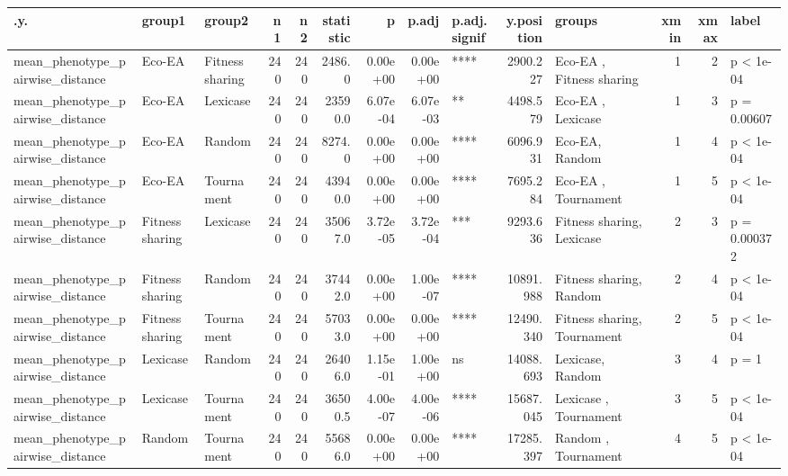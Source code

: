 \documentclass[]{book}
\begin{document}
\begin{table}
\centering
\begin{tabular}[t]{l|l|l|r|r|r|r|r|l|r|l|r|r|l}
\hline
.y. & group1 & group2 & n1 & n2 & statistic & p & p.adj & p.adj.signif & y.position & groups & xmin & xmax & label\\
\hline
mean\_phenotype\_pairwise\_distance & Eco-EA & Fitness sharing & 240 & 240 & 2486.0 & 0.00e+00 & 0.00e+00 & **** & 2900.227 & Eco-EA         , Fitness sharing & 1 & 2 & p < 1e-04\\
\hline
mean\_phenotype\_pairwise\_distance & Eco-EA & Lexicase & 240 & 240 & 23590.0 & 6.07e-04 & 6.07e-03 & ** & 4498.579 & Eco-EA  , Lexicase & 1 & 3 & p = 0.00607\\
\hline
mean\_phenotype\_pairwise\_distance & Eco-EA & Random & 240 & 240 & 8274.0 & 0.00e+00 & 0.00e+00 & **** & 6096.931 & Eco-EA, Random & 1 & 4 & p < 1e-04\\
\hline
mean\_phenotype\_pairwise\_distance & Eco-EA & Tournament & 240 & 240 & 43940.0 & 0.00e+00 & 0.00e+00 & **** & 7695.284 & Eco-EA    , Tournament & 1 & 5 & p < 1e-04\\
\hline
mean\_phenotype\_pairwise\_distance & Fitness sharing & Lexicase & 240 & 240 & 35067.0 & 3.72e-05 & 3.72e-04 & *** & 9293.636 & Fitness sharing, Lexicase & 2 & 3 & p = 0.000372\\
\hline
mean\_phenotype\_pairwise\_distance & Fitness sharing & Random & 240 & 240 & 37442.0 & 0.00e+00 & 1.00e-07 & **** & 10891.988 & Fitness sharing, Random & 2 & 4 & p < 1e-04\\
\hline
mean\_phenotype\_pairwise\_distance & Fitness sharing & Tournament & 240 & 240 & 57033.0 & 0.00e+00 & 0.00e+00 & **** & 12490.340 & Fitness sharing, Tournament & 2 & 5 & p < 1e-04\\
\hline
mean\_phenotype\_pairwise\_distance & Lexicase & Random & 240 & 240 & 26406.0 & 1.15e-01 & 1.00e+00 & ns & 14088.693 & Lexicase, Random & 3 & 4 & p = 1\\
\hline
mean\_phenotype\_pairwise\_distance & Lexicase & Tournament & 240 & 240 & 36500.5 & 4.00e-07 & 4.00e-06 & **** & 15687.045 & Lexicase  , Tournament & 3 & 5 & p < 1e-04\\
\hline
mean\_phenotype\_pairwise\_distance & Random & Tournament & 240 & 240 & 55686.0 & 0.00e+00 & 0.00e+00 & **** & 17285.397 & Random    , Tournament & 4 & 5 & p < 1e-04\\
\hline
\end{tabular}
\end{table}
\end{document}
